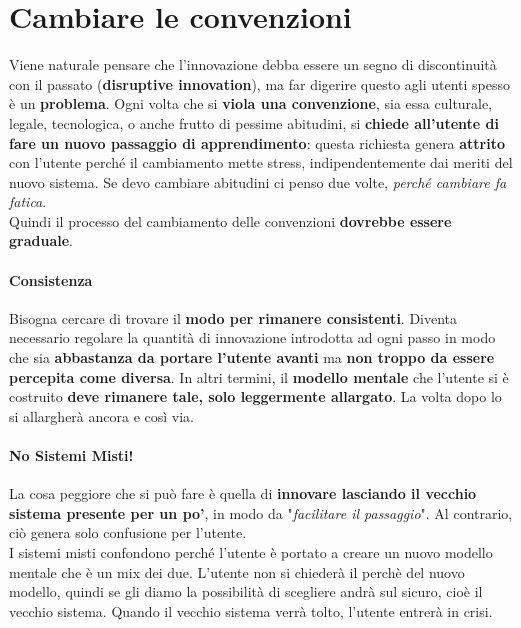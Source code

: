 \documentclass[10pt]{article}
\begin{document}
\section{Cambiare le convenzioni}
Viene naturale pensare che l'innovazione debba essere un segno di discontinuità con il passato (\textbf{disruptive innovation}), ma far digerire questo agli utenti spesso è un \textbf{problema}. Ogni volta che si \textbf{viola una convenzione}, sia essa culturale, legale, tecnologica, o anche frutto di pessime abitudini, si \textbf{chiede all'utente di fare un nuovo passaggio di apprendimento}: questa richiesta genera \textbf{attrito} con l'utente perché il cambiamento mette stress, indipendentemente dai meriti del nuovo sistema. Se devo cambiare abitudini ci penso due volte, \textit{perché cambiare fa fatica}.\\
Quindi il processo del cambiamento delle convenzioni \textbf{dovrebbe essere graduale}.
\paragraph{Consistenza} Bisogna cercare di trovare il \textbf{modo per rimanere consistenti}. Diventa necessario regolare la quantità di innovazione introdotta ad ogni passo in modo che sia \textbf{abbastanza da portare l'utente avanti} ma \textbf{non troppo da essere percepita come diversa}. In altri termini, il \textbf{modello mentale} che l'utente si è costruito \textbf{deve rimanere tale, solo leggermente allargato}. La volta dopo lo si allargherà ancora e così via.
\paragraph{No Sistemi Misti!} La cosa peggiore che si può fare è quella di \textbf{innovare lasciando il vecchio sistema presente per un po'}, in modo da "\textit{facilitare il passaggio}". Al contrario, ciò genera solo confusione per l'utente.\\
I sistemi misti confondono perché l'utente è portato a creare un nuovo modello mentale che è un mix dei due. L'utente non si chiederà il perchè del nuovo modello, quindi se gli diamo la possibilità di scegliere andrà sul sicuro, cioè il vecchio sistema. Quando il vecchio sistema verrà tolto, l'utente entrerà in crisi.
\end{document}
